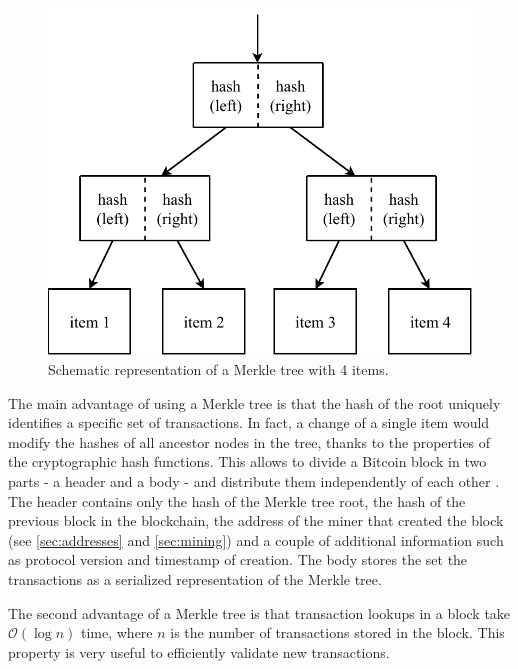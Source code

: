 \begin{figure}[ht]
	\centering
	\vspace*{0.1cm}
	\includegraphics[scale=0.7]{figures/merkle}
	\vspace*{0.25cm}
	\caption[Schematic representation of a Merkle tree]{Schematic representation of a Merkle tree with \num{4} items.}
	\label{fig:merkle}
\end{figure}

The main advantage of using a Merkle tree is that the hash of the root uniquely identifies a specific set of transactions.
In fact, a change of a single item would modify the hashes of all ancestor nodes in the tree, thanks to the properties of the cryptographic hash functions.
This allows to divide a Bitcoin block in two parts - a header and a body - and distribute them independently of each other \cite{bitcoin_reference}.
The header contains only the hash of the Merkle tree root, the hash of the previous block in the blockchain, the address of the miner that created the block (see \cref{sec:addresses} and \cref{sec:mining}) and a couple of additional information such as protocol version and timestamp of creation.
The body stores the set the transactions as a serialized representation of the Merkle tree.

The second advantage of a Merkle tree is that transaction lookups in a block take $\mathcal{O}(\log n)$ time, where $n$ is the number of transactions stored in the block.
This property is very useful to efficiently validate new transactions.


